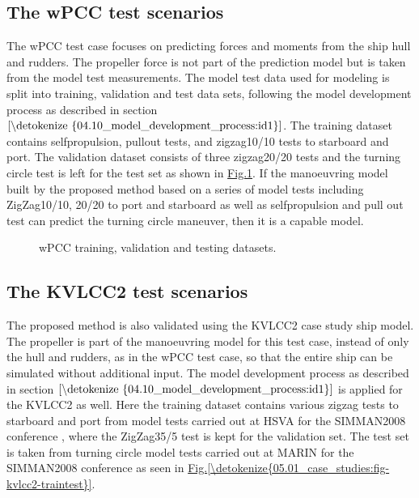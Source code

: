 \documentclass[review]{elsarticle}
\begin{document}
\subsection{The wPCC test scenarios}
\label{\detokenize{05.01_case_studies:the-wpcc-test-scenarios}}
\sphinxAtStartPar
The wPCC test case focuses on predicting forces and moments from the ship hull and rudders. The propeller force is not part of the prediction model but is taken from the model test measurements.
The model test data used for modeling is split into training, validation and test data sets, following the model development process as described in section \(\ref{\detokenize{04.10_model_development_process:id1}}\). The training dataset contains self\sphinxhyphen{}propulsion, pull\sphinxhyphen{}out tests, and zigzag10/10 tests to starboard and port. The validation dataset consists of three zigzag20/20 tests and the turning circle test is left for the test set as shown in \hyperref[\detokenize{05.01_case_studies:fig-traintest}]{Fig.\@ \ref{\detokenize{05.01_case_studies:fig-traintest}}}.
If the manoeuvring model built by the proposed method based on a series of model tests including ZigZag10/10, 20/20 to port and starboard as well as self\sphinxhyphen{}propulsion and pull out test \cite{imo_standards_2002} can predict the turning circle maneuver, then it is a capable model.

\begin{figure}[H]
\centering
\capstart

\noindent{}
\caption{wPCC training, validation and testing datasets.}\label{\detokenize{05.01_case_studies:fig-traintest}}\end{figure}


\subsection{The KVLCC2 test scenarios}
\label{\detokenize{05.01_case_studies:the-kvlcc2-test-scenarios}}
\sphinxAtStartPar
The proposed method is also validated using the KVLCC2 case study ship model.
The propeller is part of the manoeuvring model for this test case, instead of only the hull and rudders, as in the wPCC test case, so that the entire ship can be simulated without additional input.
The model development process as described in section \(\ref{\detokenize{04.10_model_development_process:id1}}\) is applied for the KVLCC2 as well.
Here the training dataset contains various zigzag tests to starboard and port from model tests carried out at HSVA for the SIMMAN2008 conference \cite{stern_experience_2011}, where the ZigZag35/5 test is kept for the validation set. The test set is taken from turning circle model tests carried out at MARIN for the SIMMAN2008 conference \cite{stern_experience_2011} as seen in \hyperref[\detokenize{05.01_case_studies:fig-kvlcc2-traintest}]{Fig.\@ \ref{\detokenize{05.01_case_studies:fig-kvlcc2-traintest}}}.
\end{document}
